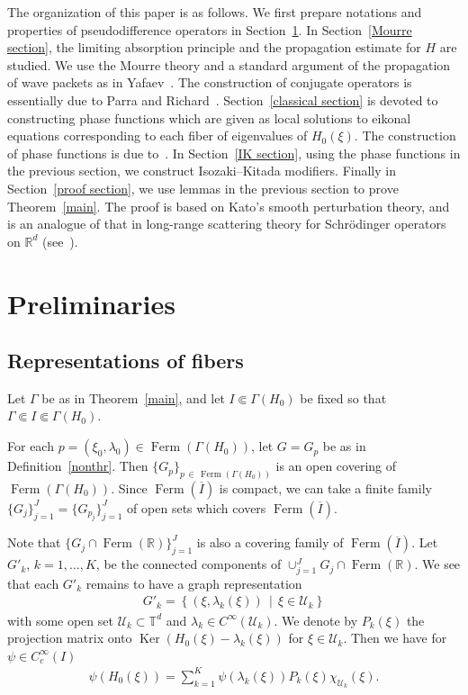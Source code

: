 \documentclass[10pt,a4paper]{amsart}
\newcommand{\Schr}{Schr\"odinger }
\newcommand{\ps}{\psi}
\renewcommand{\l}{\lambda}
\newcommand{\x}{\xi}
\newcommand{\R}{\mathbb{R}}
\newcommand{\T}{\mathbb{T}}
\newcommand{\US}{\mathcal{U}}
\DeclareMathOperator{\kerr}{Ker}
\DeclareMathOperator{\Ferm}{Ferm}
\begin{document}
The organization of this paper is as follows. We first prepare notations and properties of pseudodifference operators in Section~\ref{notations sec}. In Section~\ref{Mourre section}, the limiting absorption principle and the propagation estimate for $H$ are studied. We use the Mourre theory and a standard argument of the propagation of wave packets as in Yafaev~\cite[Chapter~10]{Y}. The construction of conjugate operators is essentially due to Parra and Richard~\cite{P-R}. Section~\ref{classical section} is devoted to constructing phase functions which are given as local solutions to eikonal equations corresponding to each fiber of eigenvalues of $H_0(\x)$. The construction of phase functions is due to~\cite{N3}. In Section~\ref{IK section}, using the phase functions in the previous section, we construct Isozaki--Kitada modifiers. Finally in Section~\ref{proof section}, we use lemmas in the previous section to prove Theorem~\ref{main}. The proof is based on Kato's smooth perturbation theory, and is an analogue of that in long-range scattering theory for \Schr operators on $\R^d$ (see~\cite{Y}).



\section{Preliminaries}\label{notations sec}



\subsection{Representations of fibers}

Let $\Gamma$ be as in Theorem~\ref{main}, and let $I \Subset \Gamma(H_0)$ be fixed so that $\Gamma \Subset I \Subset \Gamma(H_0)$.

For each $p=(\x_0,\l_0) \in \Ferm(\Gamma(H_0))$, let $G=G_p$ be as in Definition~\ref{nonthr}. Then $\{ G_p \}_{p\,\in\,\Ferm(\Gamma(H_0))}$ is an open covering of $\Ferm(\Gamma(H_0))$. Since $\Ferm(\overline{I})$ is compact, we can take a finite family $\{ G_{j} \}_{j=1}^J = \{ G_{p_j} \}_{j=1}^J$ of open sets which covers $\Ferm(\overline{I})$.

Note that $\{ G_j \cap \Ferm(\R) \}_{j=1}^J$ is also a covering family of $\Ferm(\overline{I})$. Let $G'_k$, $k=1,\dots,K$, be the connected components of $\cup_{j=1}^J G_j \cap \Ferm(\R)$. We see that each $G'_k$ remains to have a graph representation
\begin{align}\label{G_k representation}
G'_k=\left\{ (\x,\l_k(\x)) \,\middle|\, \x \in \US_k \right\}
\end{align}
with some open set $\US_k \subset \T^d$ and $\l_k\in C^\infty(\US_k)$. We denote by $P_k(\x)$ the projection matrix onto $\kerr (H_0(\x)-\l_k(\x))$ for $\x\in \US_k$. Then we have for $\psi\in C_c^\infty(I)$
\begin{align}\label{Rep of E_H0}
\ps(H_0(\x)) = \sum_{k=1}^K \ps(\l_k(\x)) P_k(\x) \chi_{\US_k}(\x).
\end{align}
\end{document}
